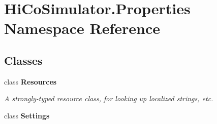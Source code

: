 \hypertarget{namespace_hi_co_simulator_1_1_properties}{}\section{Hi\+Co\+Simulator.\+Properties Namespace Reference}
\label{namespace_hi_co_simulator_1_1_properties}
\subsection*{Classes}
\begin{DoxyCompactItemize}
\item 
class {\bfseries Resources}
\begin{DoxyCompactList}\small\item\em A strongly-\/typed resource class, for looking up localized strings, etc. \end{DoxyCompactList}\item 
class {\bfseries Settings}
\end{DoxyCompactItemize}
